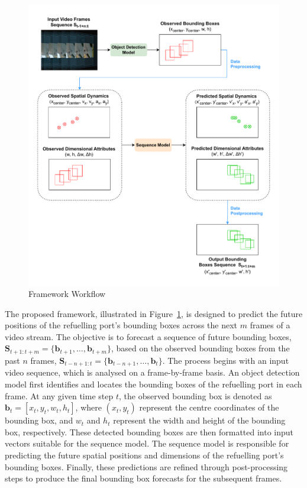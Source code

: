 \documentclass[12pt,oneside]{book} %
\begin{document}
\begin{figure}[H]
    \centering
    \includegraphics[width=1\textwidth]{figures/FrameworkWorkflow.drawio.pdf}
    \caption{Framework Workflow}\label{fig:framework-workflow}
\end{figure}

The proposed framework, illustrated in Figure~\ref{fig:framework-workflow}, is
designed to predict the future positions of the refuelling port’s bounding
boxes across the next \(m\) frames of a video stream. The objective is to
forecast a sequence of future bounding boxes, \(\mathbf{S}_{t+1:t+m} =
\{\mathbf{b}_{t+1}, \dots, \mathbf{b}_{t+m}\}\), based on the observed bounding
boxes from the past \(n\) frames, \(\mathbf{S}_{t-n+1:t} =
\{\mathbf{b}_{t-n+1}, \dots, \mathbf{b}_{t}\}\). The process begins with an
input video sequence, which is analysed on a frame-by-frame basis. An object
detection model first identifies and locates the bounding boxes of the
refuelling port in each frame. At any given time step \(t\), the observed
bounding box is denoted as \(\mathbf{b}_t = [x_t, y_t, w_t, h_t]\), where
\((x_t, y_t)\) represent the centre coordinates of the bounding box, and
\(w_t\) and \(h_t\) represent the width and height of the bounding box,
respectively. These detected bounding boxes are then formatted into input
vectors suitable for the sequence model. The sequence model is responsible for
predicting the future spatial positions and dimensions of the refuelling port’s
bounding boxes. Finally, these predictions are refined through post-processing
steps to produce the final bounding box forecasts for the subsequent frames.
\end{document}
